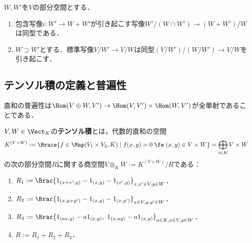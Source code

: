 \documentclass[uplatex, dvipdfmx]{jsreport}
\begin{document}
\begin{corollary}[第二・第三同型定理]
    $W,W'$を$V$の部分空間とする．
    \begin{enumerate}
        \item 包含写像$i:W'\to W+W'$が引き起こす写像$W'/(W\cap W')\to(W+W')/W$は同型である．
        \item $W\supset W'$とする．標準写像$V/W'\to V/W$は同型$(V/W')/(W/W')\to V/W$を引き起こす．
    \end{enumerate}
\end{corollary}

\subsection{テンソル積の定義と普遍性}

\begin{tcolorbox}[colframe=ForestGreen, colback=ForestGreen!10!white,breakable,colbacktitle=ForestGreen!40!white,coltitle=black,fonttitle=\bfseries\sffamily,
title=]
    直和の普遍性は$\Hom(V\oplus W,V')\to\Hom(V,V')\times\Hom(W,V')$が全単射であることである．

\end{tcolorbox}

\begin{definition}
    $V,W\in\Vect_K$の\textbf{テンソル積}とは，代数的直和の空間
    \[K^{(V\times W)}:=\Brace{f\in\Map(V_1\times V_2,K)\mid f(x,y)=0\;\fe\; (x,y)\in V\times W}=\bigoplus_{i\in K}V\times W\]
    の次の部分空間$R$に関する商空間$V\otimes_KW:=K^{(V\times W)}/R$である：
    \begin{enumerate}
        \item $R_1:=\Brac{1_{(x+x',y)}-1_{(x,y)}-1_{(x',y)}}_{x,x'\in V,y\in W}$．
        \item $R_2:=\Brac{1_{(x,y+y')}-1_{(x,y)}-1_{(x,y')}}_{x\in V,y,y'\in W}$．
        \item $R_3:=\Brac{1_{(ax,y)}-a1_{(x,y)},\;1_{(x,ay)}-a1_{(x,y)}}_{a\in K,x\in V,y\in W}$．
        \item $R:=R_1+R_2+R_3$．
    \end{enumerate}
\end{definition}
\end{document}
